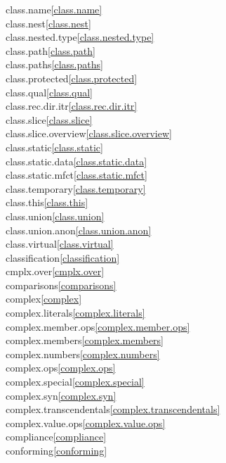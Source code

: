 \begin{multicols}{2}
class.name\quad\ref{class.name}\\
class.nest\quad\ref{class.nest}\\
class.nested.type\quad\ref{class.nested.type}\\
class.path\quad\ref{class.path}\\
class.paths\quad\ref{class.paths}\\
class.protected\quad\ref{class.protected}\\
class.qual\quad\ref{class.qual}\\
class.rec.dir.itr\quad\ref{class.rec.dir.itr}\\
class.slice\quad\ref{class.slice}\\
class.slice.overview\quad\ref{class.slice.overview}\\
class.static\quad\ref{class.static}\\
class.static.data\quad\ref{class.static.data}\\
class.static.mfct\quad\ref{class.static.mfct}\\
class.temporary\quad\ref{class.temporary}\\
class.this\quad\ref{class.this}\\
class.union\quad\ref{class.union}\\
class.union.anon\quad\ref{class.union.anon}\\
class.virtual\quad\ref{class.virtual}\\
classification\quad\ref{classification}\\
cmplx.over\quad\ref{cmplx.over}\\
comparisons\quad\ref{comparisons}\\
complex\quad\ref{complex}\\
complex.literals\quad\ref{complex.literals}\\
complex.member.ops\quad\ref{complex.member.ops}\\
complex.members\quad\ref{complex.members}\\
complex.numbers\quad\ref{complex.numbers}\\
complex.ops\quad\ref{complex.ops}\\
complex.special\quad\ref{complex.special}\\
complex.syn\quad\ref{complex.syn}\\
complex.transcendentals\quad\ref{complex.transcendentals}\\
complex.value.ops\quad\ref{complex.value.ops}\\
compliance\quad\ref{compliance}\\
conforming\quad\ref{conforming}\\

\end{multicols}
